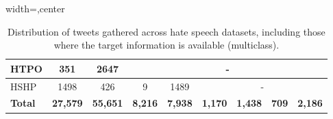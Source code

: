 \begin{table}[ht]
\begin{adjustbox}{width=\textwidth,center}
\begin{tabular}{|l|cc|ccclll|}
HTPO                                                       & \multicolumn{1}{c|}{351}             & 2647              & \multicolumn{6}{c|}{-}                                                                                                                                                                                                                                    \\ \hline
HSHP                                                       & \multicolumn{1}{c|}{1498}             &     426          & \multicolumn{1}{c|}{9}               & \multicolumn{1}{c|}{1489}            & \multicolumn{4}{c|}{-}                                                                                                                                                      \\ \hline
\textbf{Total}                                          & \multicolumn{1}{c|}{\textbf{27,579}} & \textbf{55,651}   & \multicolumn{1}{c|}{\textbf{8,216}}  & \multicolumn{1}{c|}{\textbf{7,938}}  & \multicolumn{1}{c|}{\textbf{1,170}}               & \multicolumn{1}{c|}{\textbf{1,438}}      & \multicolumn{1}{c|}{\textbf{709}}      & \multicolumn{1}{c|}{\textbf{2,186}} \\ \hline
\end{tabular}
\end{adjustbox}

\caption{Distribution of tweets gathered across hate speech datasets, including those where the target information is available (multiclass).}
\label{tab:data_distribution}

\end{table}

